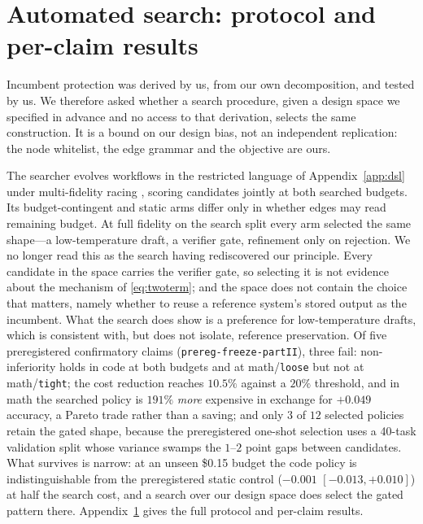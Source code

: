 \documentclass{article}
\begin{document}
\section{Automated search: protocol and per-claim results}
\label{app:searchdetail}

Incumbent protection was derived by us, from our own decomposition, and tested
by us. We therefore asked whether a search procedure, given a design space we
specified in advance and no access to that derivation, selects the same
construction. It is a bound on our design bias, not an independent replication:
the node whitelist, the edge grammar and the objective are ours.

The searcher evolves workflows in the restricted language of
Appendix~\ref{app:dsl} under multi-fidelity racing
\citep{jamieson2016successive}, scoring candidates jointly at both searched
budgets. Its budget-contingent and static arms differ only in whether edges may
read remaining budget. At full fidelity on the search split every arm selected
the same shape---a low-temperature draft, a verifier gate, refinement only on
rejection. We no longer read this as the search having rediscovered our
principle. Every candidate in the space carries the verifier gate, so selecting
it is not evidence about the mechanism of \eqref{eq:twoterm}; and the space does
not contain the choice that matters, namely whether to reuse a reference
system's stored output as the incumbent. What the search does show is a
preference for low-temperature drafts, which is consistent with, but does not
isolate, reference preservation. Of five preregistered confirmatory claims
(\texttt{prereg-freeze-partII}), three fail: non-inferiority holds in code at
both budgets and at math/\texttt{loose} but not at math/\texttt{tight}; the cost
reduction reaches $10.5\%$ against a $20\%$ threshold, and in math the searched
policy is $191\%$ \emph{more} expensive in exchange for $+0.049$ accuracy, a
Pareto trade rather than a saving; and only $3$ of $12$ selected policies retain
the gated shape, because the preregistered one-shot selection uses a 40-task
validation split whose variance swamps the $1$--$2$ point gaps between
candidates. What survives is narrow: at an unseen \$0.15 budget the code policy
is indistinguishable from the preregistered static control ($-0.001$
$[-0.013,+0.010]$) at half the search cost, and a search over our design space
does select the gated pattern there. Appendix~\ref{app:searchdetail} gives the
full protocol and per-claim results.
\end{document}
